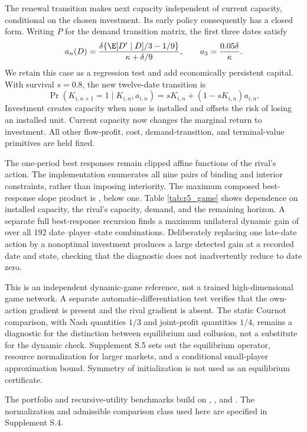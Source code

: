 The renewal transition makes next capacity independent of current capacity, conditional on the chosen investment. Its early policy consequently has a closed form. Writing $P$ for the demand transition matrix, the first three dates satisfy
\begin{equation}
 a_n(D)=\frac{\delta\{\E[D'\mid D]/3-1/9\}}{\kappa+\delta/9},
 \qquad a_3=\frac{0.05\delta}{\kappa}.
 \label{eq:renewal_closed}
\end{equation}
We retain this case as a regression test and add economically persistent capital. With survival $s=0.8$, the new twelve-date transition is
\begin{equation}
 \Pr(K_{i,n+1}=1\mid K_{i,n},a_{i,n})
 =sK_{i,n}+(1-sK_{i,n})a_{i,n}.
 \label{eq:persistent_capacity}
\end{equation}
Investment creates capacity when none is installed and offsets the risk of losing an installed unit. Current capacity now changes the marginal return to investment. All other flow-profit, cost, demand-transition, and terminal-value primitives are held fixed.

The one-period best responses remain clipped affine functions of the rival's action. The implementation enumerates all nine pairs of binding and interior constraints, rather than imposing interiority. The maximum composed best-response slope product is \NBOGameContraction{}, below one. Table \ref{tab:r5_game} shows dependence on installed capacity, the rival's capacity, demand, and the remaining horizon. A separate full best-response recursion finds a maximum unilateral dynamic gain of \NBOGameGain{} over all 192 date--player--state combinations. Deliberately replacing one late-date action by a nonoptimal investment produces a large detected gain at a recorded date and state, checking that the diagnostic does not inadvertently reduce to date zero.


This is an independent dynamic-game reference, not a trained high-dimensional game network. A separate automatic-differentiation test verifies that the own-action gradient is present and the rival gradient is absent. The static Cournot comparison, with Nash quantities $1/3$ and joint-profit quantities $1/4$, remains a diagnostic for the distinction between equilibrium and collusion, not a substitute for the dynamic check. Supplement S.5 sets out the equilibrium operator, resource normalization for larger markets, and a conditional small-player approximation bound. Symmetry of initialization is not used as an equilibrium certificate.

The portfolio and recursive-utility benchmarks build on \citet{merton1971}, \citet{epstein1989}, and \citet{duffie1992}. The normalization and admissible comparison class used here are specified in Supplement S.4.
